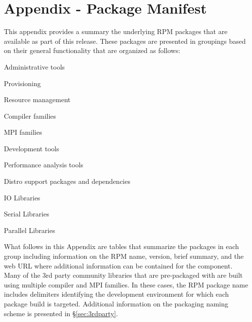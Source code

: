 \clearpage

\appendix
\section*{Appendix - Package Manifest}
\renewcommand{\thesubsection}{\Alph{subsection}}


This appendix provides a summary the underlying RPM packages that are available
as part of this \FSP{} release. These packages are presented in groupings
based on their general functionality that are organized as follows:

\begin{itemize*}
\item Administrative tools
\item Provisioning
\item Resource management
\item Compiler families
\item MPI families
\item Development tools
\item Performance analysis tools
\item Distro support packages and dependencies
\item IO Libraries
\item Serial Libraries
\item Parallel Libraries
\end{itemize*}

What follows in this Appendix are tables that summarize the packages in each
group including information on the RPM name, version, brief summary, and the web
URL where additional information can be contained for the component. Many of the 3rd
party community libraries that are pre-packaged with \FSP{} are built using
multiple compiler and MPI families. In these cases, the RPM package name
includes delimiters identifying the development environment for which each
package build is targeted.  Additional information on the \FSP{} packaging
naming scheme is presented in \S\ref{sec:3rdparty}.



\newcommand{\firstColWidth}{3.5cm}
\newcommand{\secondColWidth}{1.5cm}

